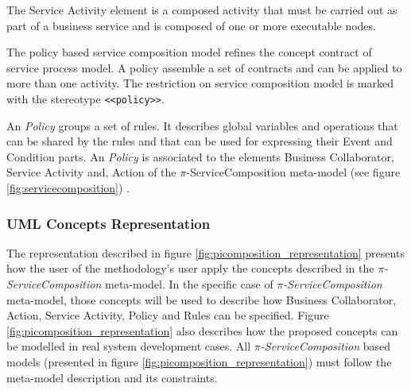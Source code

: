 The {\sc Service Activity} element is a composed activity
that must be carried out as part of a business service and
is composed of one or more executable nodes.


The policy based service composition model refines the concept contract of
service process model. A policy assemble a set of contracts and can be
applied to more than one activity. The restriction on service composition model
is marked with the stereotype \texttt{<<policy>>}.


An {\em Policy} groups a set of rules. It describes global variables and
operations that can be shared by the rules and that can be used for expressing
their Event  and Condition parts. An {\em Policy} is associated to the
elements {\sc Business Collaborator}, {\sc Service Activity} and, {\sc Action}  of
the $\pi$-ServiceComposition meta-model (see figure
\ref{fig:servicecomposition}) .




 \subsubsection{UML Concepts Representation} 
 
 
 

The representation described in figure \ref{fig:picomposition_representation}
presents how the user of the methodology's user apply the concepts described in
the \textit{$\pi$-ServiceComposition} meta-model. In the specific case
of \textit{$\pi$-ServiceComposition} meta-model, those concepts will be used to
describe how {\sc Business Collaborator, Action, Service Activity, Policy and
Rules} can be specified. Figure \ref{fig:picomposition_representation}
also describes how the proposed concepts can be modelled in real system
development cases. All \textit{$\pi$-ServiceComposition} based models
(presented in figure \ref{fig:picomposition_representation}) must follow the
meta-model description and its constraints.
 

